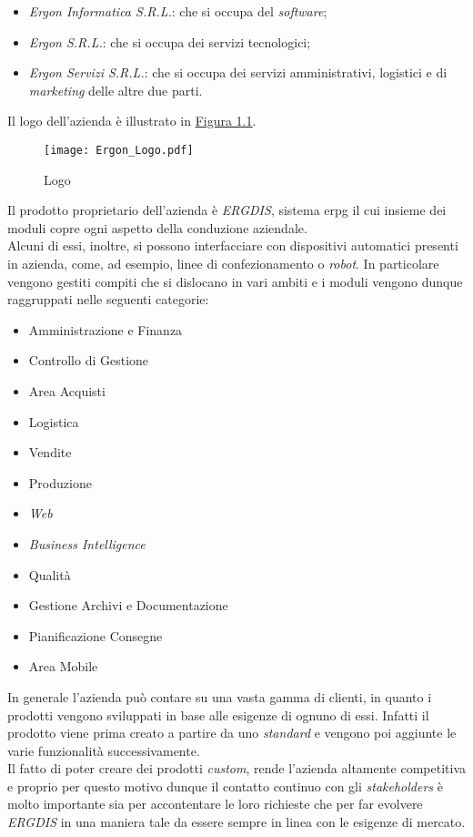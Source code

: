 \begin{itemize}
    \item \textit{Ergon Informatica S.R.L.}: che si occupa del \textit{software};
    \item \textit{Ergon S.R.L.}: che si occupa dei servizi tecnologici;
    \item \textit{Ergon Servizi S.R.L.}: che si occupa dei servizi amministrativi, logistici e di \textit{marketing} delle altre due parti.
\end{itemize}
Il logo dell'azienda è illustrato in \hyperref[fig:logo]{Figura 1.1}.
\vfill
\begin{figure}[!h]
    \centering
    \texttt{[image: Ergon\_Logo.pdf]}
    \caption{Logo \myCompany}
    \label{fig:logo}
\end{figure}
\vfill
\noindent Il prodotto proprietario dell'azienda è \textit{ERGDIS}, sistema \gls{erpg}
il cui insieme dei moduli copre ogni aspetto della conduzione aziendale.\\
Alcuni di essi, inoltre, si possono interfacciare con dispositivi automatici presenti in azienda, come, ad esempio,
linee di confezionamento o \textit{robot}.
\newpage
\noindent In particolare  vengono gestiti compiti che si dislocano in vari ambiti e
i moduli vengono dunque raggruppati nelle seguenti categorie:
\begin{multicols}{2}
\begin{itemize}
    \item Amministrazione e Finanza
    \item Controllo di Gestione
    \item Area Acquisti
    \item Logistica
    \item Vendite
    \item Produzione
\end{itemize}
\begin{itemize}
    \item \textit{Web}
    \item \textit{Business Intelligence}
    \item Qualità
    \item Gestione Archivi e Documentazione
    \item Pianificazione Consegne
    \item Area Mobile
\end{itemize}
\end{multicols}

\noindent In generale l'azienda può contare su una vasta gamma di clienti,
in quanto i prodotti vengono sviluppati in base alle esigenze di ognuno di essi.
Infatti il prodotto viene prima creato a partire da uno \textit{standard}
e vengono poi aggiunte le varie funzionalità successivamente.\\
Il fatto di poter creare dei prodotti \textit{custom}, rende l'azienda altamente competitiva
e proprio per questo motivo dunque il contatto
continuo con gli \textit{stakeholders} è molto importante sia per accontentare le loro richieste che per
far evolvere \textit{ERGDIS} in una maniera tale da essere sempre in linea con le esigenze di mercato.


